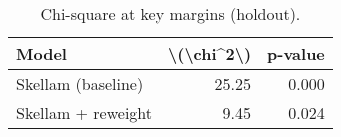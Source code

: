 \begin{table}

\caption{\label{tab:unnamed-chunk-2}Chi-square at key margins (holdout).}
\centering
\begin{tabular}[t]{lrr}
\toprule
Model & \textbackslash{}(\textbackslash{}chi\textasciicircum{}2\textbackslash{}) & p-value\\
\midrule
Skellam (baseline) & 25.25 & 0.000\\
Skellam + reweight & 9.45 & 0.024\\
\bottomrule
\end{tabular}
\end{table}
